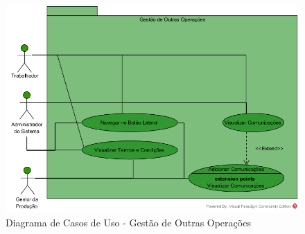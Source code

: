 \documentclass{scrreprt}
\begin{document}
	\begin{figure}[!h]
		\centering
		\includegraphics[width=0.8\linewidth]{"Diagrama de Casos de Uso - Gestão de Outras Operações"}
		\caption{Diagrama de Casos de Uso - Gestão de Outras Operações}
		\label{fig:diagrama-de-casos-de-uso---gestao-de-outras-operacoes}
	\end{figure}
	
\end{document}
